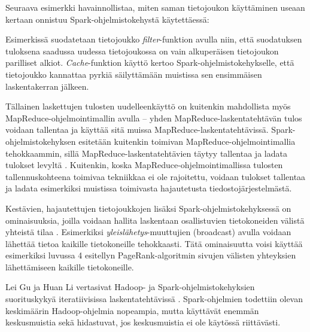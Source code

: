 \documentclass[finnish]{templates/tktltiki2}
\newenvironment{Shaded}{}{}
\newcommand{\KeywordTok}[1]{\textcolor[rgb]{0.00,0.44,0.13}{\textbf{{#1}}}}
\newcommand{\DecValTok}[1]{\textcolor[rgb]{0.25,0.63,0.44}{{#1}}}
\newcommand{\CommentTok}[1]{\textcolor[rgb]{0.38,0.63,0.69}{\textit{{#1}}}}
\newcommand{\FunctionTok}[1]{\textcolor[rgb]{0.02,0.16,0.49}{{#1}}}
\newcommand{\NormalTok}[1]{{#1}}
\theoremstyle{definition}
\theoremstyle{remark}
\begin{document}
Seuraava esimerkki havainnollistaa, miten saman tietojoukon käyttäminen
useaan kertaan onnistuu Spark-ohjelmistokehystä käytettäessä:

\begin{Shaded}
\end{Shaded}

Esimerkissä suodatetaan tietojoukko \emph{filter}-funktion avulla niin,
että suodatuksen tuloksena saadussa uudessa tietojoukossa on vain
alkuperäisen tietojoukon parilliset alkiot. \emph{Cache}-funktion käyttö
kertoo Spark-ohjelmistokehykselle, että tietojoukko kannattaa pyrkiä
säilyttämään muistissa sen ensimmäisen laskentakerran jälkeen.

Tällainen laskettujen tulosten uudelleenkäyttö on kuitenkin mahdollista
myös MapReduce-ohjelmointimallin avulla -- yhden
MapReduce-laskentatehtävän tulos voidaan tallentaa ja käyttää sitä
muissa MapReduce-laskentatehtävissä. Spark-ohjelmistokehyksen esitetään
kuitenkin toimivan MapReduce-ohjelmointimallia tehokkaammin, sillä
MapReduce-laskentatehtävien täytyy tallentaa ja ladata tulokset levyltä
\cite{spark}. Kuitenkin, koska MapReduce-ohjelmointimallissa
tulosten tallennuskohteena toimivaa tekniikkaa ei ole rajoitettu,
voidaan tulokset tallentaa ja ladata esimerkiksi muistissa toimivasta
hajautetusta tiedostojärjestelmästä.

Kestävien, hajautettujen tietojoukkojen lisäksi
Spark-ohjelmistokehyksessä on ominaisuuksia, joilla voidaan hallita
laskentaan osallistuvien tietokoneiden välistä yhteistä tilaa
\cite{spark}. Esimerkiksi \emph{yleislähetys}-muuttujien (broadcast)
avulla voidaan lähettää tietoa kaikille tietokoneille tehokkaasti. Tätä
ominaisuutta voisi käyttää esimerkiksi luvussa 4 esitellyn
PageRank-algoritmin sivujen välisten yhteyksien lähettämiseen kaikille
tietokoneille.

Lei Gu ja Huan Li vertasivat Hadoop- ja Spark-ohjelmistokehyksien
suorituskykyä iteratiivisissa laskentatehtävissä
\cite{spark-hadoop-comparison}. Spark-ohjelmien todettiin olevan
keskimäärin Hadoop-ohjelmia nopeampia, mutta käyttävät enemmän
keskusmuistia sekä hidastuvat, jos keskusmuistia ei ole käytössä
riittävästi.
\end{document}
